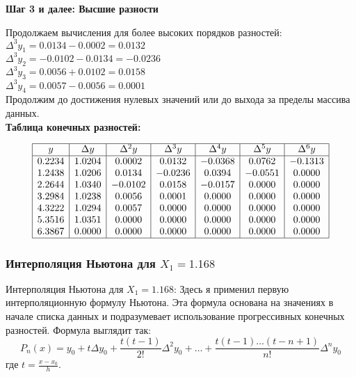 \documentclass{article}
\begin{document}
                  \textbf{Шаг 3 и далее: Высшие разности}

                  Продолжаем вычисления для более высоких порядков разностей:
                  \\   
                  \(\Delta^3 y_1 = 0.0134 - 0.0002 = 0.0132\) \\
                  \(\Delta^3 y_2 = -0.0102 - 0.0134 = -0.0236\) \\
                  \(\Delta^3 y_3 = 0.0056 + 0.0102 = 0.0158\) \\
                  \(\Delta^3 y_4 = 0.0057 - 0.0056 = 0.0001\) \\

                  Продолжим до достижения нулевых значений или до выхода за пределы массива данных.
                  \\
                  \textbf{Таблица конечных разностей:}
 
                  \[
                  \begin{array}{|c|c|c|c|c|c|c|c|}
                  \hline
                  y & \Delta y & \Delta^2 y & \Delta^3 y & \Delta^4 y & \Delta^5 y & \Delta^6 y \\
                  \hline
                  0.2234 & 1.0204 & 0.0002 & 0.0132 & -0.0368 & 0.0762 & -0.1313 \\
                  1.2438 & 1.0206 & 0.0134 & -0.0236 & 0.0394 & -0.0551 & 0.0000 \\
                  2.2644 & 1.0340 & -0.0102 & 0.0158 & -0.0157 & 0.0000 & 0.0000 \\
                  3.2984 & 1.0238 & 0.0056 & 0.0001 & 0.0000 & 0.0000 & 0.0000 \\
                  4.3222 & 1.0294 & 0.0057 & 0.0000 & 0.0000 & 0.0000 & 0.0000 \\
                  5.3516 & 1.0351 & 0.0000 & 0.0000 & 0.0000 & 0.0000 & 0.0000 \\
                  6.3867 & 0.0000 & 0.0000 & 0.0000 & 0.0000 & 0.0000 & 0.0000 \\
                  \hline
                  \end{array}
                  \]
            \subsubsection{Интерполяция Ньютона для \( X_1 = 1.168 \)}
                  Интерполяция Ньютона для \( X_1 = 1.168 \): Здесь я применил первую интерполяционную формулу Ньютона. Эта формула основана на значениях в начале списка данных и подразумевает использование прогрессивных конечных разностей. Формула выглядит так:
                  \[
                  P_n(x) = y_0 + t \Delta y_0 + \frac{t(t-1)}{2!} \Delta^2 y_0 + \ldots + \frac{t(t-1)\ldots(t-n+1)}{n!} \Delta^n y_0
                  \]
                  где \( t = \frac{x - x_0}{h} \).
                  
\end{document}
